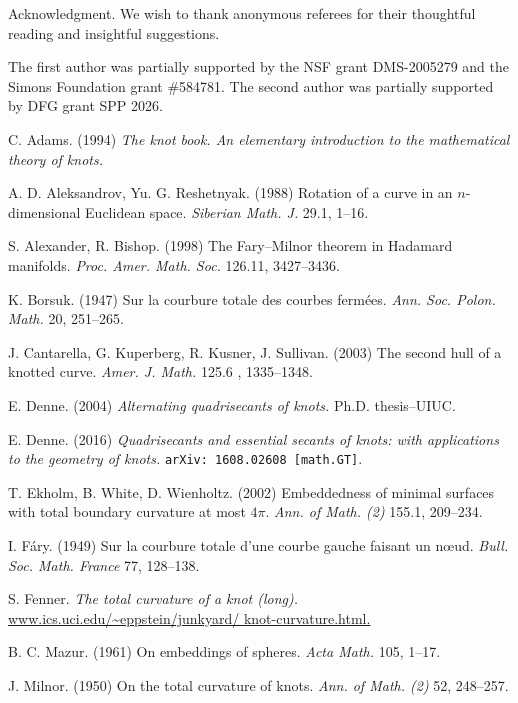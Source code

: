 \documentclass{article}
\theoremstyle{theorem}
\newtheorem{Crofton-type formula}[theorem]{Crofton-type formula}
\newtheorem{Douglas--Rado theorem}[theorem]{Douglas--Rado theorem}
\newtheorem{Extended monotonicity theorem}[theorem]{Extended monotonicity theorem}
\theoremstyle{definition}
\begin{document}
\begin{acknowledgment}{Acknowledgment.}
We wish to thank anonymous referees for their thoughtful reading and insightful suggestions.

The first author was partially supported by the NSF grant DMS-2005279 and the Simons Foundation grant \#584781.
The second author was partially supported by DFG grant SPP 2026.
\end{acknowledgment}

\begin{thebibliography}{2}
C. Adams. (1994) \textit{The knot book. An elementary introduction to the mathematical theory of knots.}

A. D. Aleksandrov, Yu. G. Reshetnyak. (1988) Rotation of a curve in an $n$-dimensional Euclidean
space. \textit{Siberian Math. J.} 29.1, 1--16.

S. Alexander, R. Bishop. (1998) The Fary--Milnor theorem in Hadamard manifolds. \textit{Proc. Amer.
Math. Soc.} 126.11, 3427--3436.

K. Borsuk. (1947) Sur la courbure totale des courbes fermées. \textit{Ann. Soc. Polon. Math.} 20,
251--265.


J. Cantarella, G. Kuperberg, R. Kusner, J. Sullivan. (2003) The second hull of a knotted curve.
\textit{Amer. J. Math.} 125.6 , 1335--1348.


E. Denne. (2004) \textit{Alternating quadrisecants of knots.} Ph.D. thesis–UIUC.


E. Denne. (2016) \textit{Quadrisecants and essential secants of knots: with applications to the geometry
of knots.} \texttt{arXiv: 1608.02608 [math.GT]}.

T. Ekholm, B. White, D. Wienholtz. (2002)
Embeddedness of minimal surfaces with total boundary
curvature at most $4\pi$. \textit{Ann. of Math. (2)} 155.1, 209--234.


I. Fáry. (1949) Sur la courbure totale d’une courbe gauche faisant un nœud. \textit{Bull. Soc. Math.
France} 77, 128–138.

S. Fenner. \textit{The total curvature of a knot (long).} \url{www.ics.uci.edu/~eppstein/junkyard/
knot-curvature.html.}


B. C. Mazur. 
(1961)
On embeddings of spheres.
\textit{Acta Math.} 105, 1–17.

J. Milnor. 
(1950)
On the total curvature of knots.
\textit{Ann. of Math. (2)} 52, 248--257.



\end{thebibliography}
\end{document}

